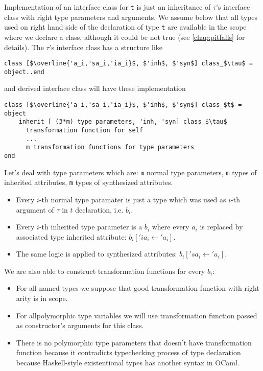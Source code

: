 \documentclass[acmsmall,review,anonymous]{acmart}\settopmatter{printfolios=true,printccs=false,printacmref=false}
\begin{document}
Implementation of an interface class for \lstinline{t} is just an inheritance of  $\tau$'s interface class with right type parameters and arguments. We assume below that all types used on right hand side of the declaration of type \lstinline{t} are available in the scope where we declare a class, although it could be not true (see \autoref{chap:pitfalls} for details). The $\tau$'s interface class has a structure like
\begin{lstlisting}
class [$\overline{'a_i,'sa_i,'ia_i}$, $'inh$, $'syn$] class_$\tau$ = object..end
\end{lstlisting}
and derived interface class will have these implementation
\begin{lstlisting}
class [$\overline{'a_i,'sa_i,'ia_i}$, $'inh$, $'syn$] class_$t$ = object
    inherit [ (3*m) type parameters, 'inh, 'syn] class_$\tau$ 
      transformation function for self
      ...
      m transformation functions for type parameters
end
\end{lstlisting}
Let's deal with type parameters which are: \lstinline{m} normal type parameters, \lstinline{m} types of inherited attributes, \lstinline{m} types of synthesized attributes. 
\begin{itemize}
 \item Every $i$-th normal type paramater is just a type which was used as $i$-th argument of $\tau$ in $t$ declaration, i.e. $b_i$.
 \item Every $i$-th inherited type parameter is a $b_i$ where every $a_i$ is replaced by associated type inherited attribute:  $b_i['ia_i \gets \!'a_i]$.
 \item The same logic is applied to synthesized attributes: $b_i['sa_i \gets \!'a_i]$.
\end{itemize}
We are also able to construct transformation functions for every $b_i$: 
\begin{itemize}
 \item For all named types we suppose that good transformation function with right arity is in scope.
 \item For allpolymorphic type variables we will use transformation function passed as constructor's arguments for this class.
 \item There is no polymorphic type parameters that doesn't have transformation function because it contradicts typechecking process of type declaration because Haskell-style existentional types has another syntax in OCaml.
\end{itemize}
\end{document}
